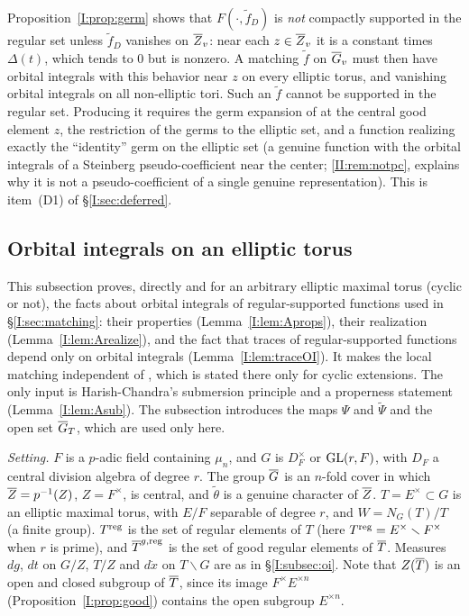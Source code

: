 \begin{remark}
Proposition~\ref{I:prop:germ} shows that $F(\cdot,\tilde f_D)$ is \emph{not} compactly supported in the regular set unless $\tilde f_D$ vanishes on $\overline{Z}_v$: near each $z\in\overline{Z}_v$ it is a constant times $\Delta(t)$, which tends to $0$ but is nonzero. A matching $\tilde f$ on $\overline{G}_v$ must then have orbital integrals with this behavior near $z$ on every elliptic torus, and vanishing orbital integrals on all non-elliptic tori. Such an $\tilde f$ cannot be supported in the regular set. Producing it requires the germ expansion of \cite[\S8]{FK86} at the central good element $z$, the restriction of the germs to the elliptic set, and a function realizing exactly the ``identity'' germ on the elliptic set (a genuine function with the orbital integrals of a Steinberg pseudo-coefficient near the center; \cref{II:rem:notpc}, explains why it is not a pseudo-coefficient of a single genuine representation). This is item~(D1) of \S\ref{I:sec:deferred}.
\end{remark}


\subsection{Orbital integrals on an elliptic torus}\label{I:app:oi}
This subsection proves, directly and for an arbitrary elliptic maximal torus (cyclic or not), the facts about orbital integrals of regular-supported functions used in \S\ref{I:sec:matching}: their properties (Lemma~\ref{I:lem:Aprops}), their realization (Lemma~\ref{I:lem:Arealize}), and the fact that traces of regular-supported functions depend only on orbital integrals (Lemma~\ref{I:lem:traceOI}). It makes the local matching independent of \cite[Lemma~4.5]{JC26a}, which is stated there only for cyclic extensions. The only input is Harish-Chandra's submersion principle and a properness statement (Lemma~\ref{I:lem:Asub}). The subsection introduces the maps $\Psi$ and $\tilde\Psi$ and the open set $\overline{G}_T$, which are used only here.

\emph{Setting.} $F$ is a $p$-adic field containing $\mu_n$, and $G$ is $D_F^\times$ or $\mathrm{GL}(r,F)$, with $D_F$ a central division algebra of degree $r$. The group $\overline{G}$ is an $n$-fold cover in which $\overline{Z}=p^{-1}(Z)$, $Z=F^\times$, is central, and $\tilde\theta$ is a genuine character of $\overline{Z}$. $T=E^\times\subset G$ is an elliptic maximal torus, with $E/F$ separable of degree $r$, and $W=N_G(T)/T$ (a finite group). $T^{\mathrm{reg}}$ is the set of regular elements of $T$ (here $T^{\mathrm{reg}}=E^\times\smallsetminus F^\times$ when $r$ is prime), and $\overline{T}^{g,\mathrm{reg}}$ is the set of good regular elements of $\overline{T}$. Measures $dg$, $dt$ on $G/Z$, $T/Z$ and $d\dot x$ on $T\backslash G$ are as in \S\ref{I:subsec:oi}. Note that $Z(\overline{T})$ is an open and closed subgroup of $\overline{T}$, since its image $F^\times E^{\times n}$ (Proposition~\ref{I:prop:good}) contains the open subgroup $E^{\times n}$.

